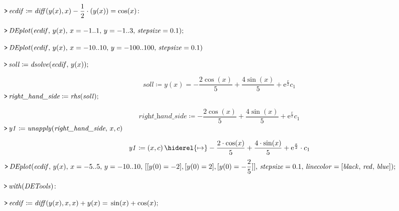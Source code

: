 \documentclass{article}
\begin{document}
\mapleinput
{$ \displaystyle \texttt{>\,} \mathit{ecdif} \coloneqq \mathit{diff} (y (x),x)-\frac{1}{2}\cdot (y (x))=\cos (x)\colon  $}

\mapleinput
{$ \displaystyle \texttt{>\,} \mathit{DEplot} (\mathit{ecdif} ,\,y (x),\,x =-1..1,\,y =-1..3,\,\mathit{stepsize} = 0.1); $}

{}
\mapleinput
{$ \displaystyle \texttt{>\,} \mathit{DEplot} (\mathit{ecdif} ,\,y (x),\,x =-10..10,\,y =-100..100,\,\mathit{stepsize} = 0.1) $}

{}
\mapleinput
{$ \displaystyle \texttt{>\,} \mathit{soll} \coloneqq \mathit{dsolve} (\mathit{ecdif} ,\,y (x)); $}

\begin{dmath}\label{(13)}
\mathit{soll} \coloneqq y \! \left(x \right)=-\frac{2 \cos \! \left(x \right)}{5}+\frac{4 \sin \! \left(x \right)}{5}+{\mathrm e}^{\frac{x}{2}} c_{1}
\end{dmath}
\mapleinput
{$ \displaystyle \texttt{>\,} \textit{right\_hand\_side} \coloneqq \mathit{rhs} (\mathit{soll}); $}

\begin{dmath}\label{(14)}
\textit{right\_hand\_side} \coloneqq -\frac{2 \cos \! \left(x \right)}{5}+\frac{4 \sin \! \left(x \right)}{5}+{\mathrm e}^{\frac{x}{2}} c_{1}
\end{dmath}
\mapleinput
{$ \displaystyle \texttt{>\,} \mathit{y1} \coloneqq \mathit{unapply} (\textit{right\_hand\_side} ,\,x ,c) $}

\begin{dmath}\label{(15)}
\mathit{y1} \coloneqq \left(x ,c \right)\hiderel{\mapsto }-\frac{2\cdot \cos \! \left(x \right)}{5}+\frac{4\cdot \sin \! \left(x \right)}{5}+{\mathrm e}^{\frac{x}{2}}\cdot c_{1}
\end{dmath}
\mapleinput
{$ \displaystyle \texttt{>\,} \mathit{DEplot} (\mathit{ecdif} ,\,y (x),\,x =-5..5,\,y =-10..10,\,[[y (0)=-2],[y (0)=2],[y (0)=-\frac{2}{5}]],\,\mathit{stepsize} = 0.1,\,\mathit{linecolor} =[\mathit{black} ,\,\mathit{red} ,\,\mathit{blue}]); $}

{}
\mapleinput
{$ \displaystyle \texttt{>\,} \mathit{with} (\mathit{DETools})\colon  $}

\mapleinput
{$ \displaystyle \texttt{>\,} \mathit{ecdif} \coloneqq \mathit{diff} (y (x),x ,x)+y (x)=\,\sin (x)+\cos (x); $}
\end{document}
